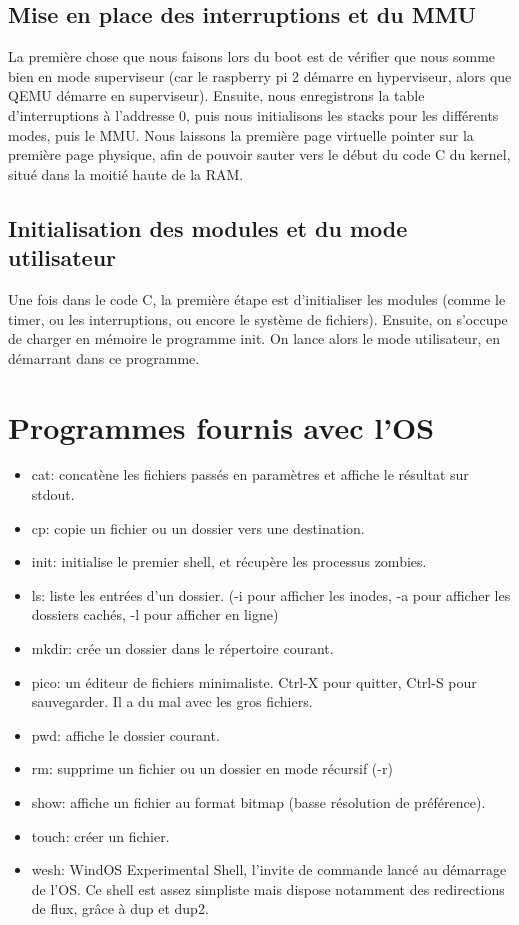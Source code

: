 \documentclass[a4paper]{article}
\begin{document}
\subsection{Mise en place des interruptions et du MMU}

La première chose que nous faisons lors du boot est de vérifier que nous somme
bien en mode superviseur (car le raspberry pi 2 démarre en hyperviseur, alors
que QEMU démarre en superviseur). Ensuite, nous enregistrons la table
d'interruptions à l'addresse 0, puis nous initialisons les stacks pour les
différents modes, puis le MMU. Nous laissons la première page virtuelle pointer
sur la première page physique, afin de pouvoir sauter vers le début du code C du
kernel, situé dans la moitié haute de la RAM.

\subsection{Initialisation des modules et du mode utilisateur}

Une fois dans le code C, la première étape est d'initialiser les modules (comme
le timer, ou les interruptions, ou encore le système de fichiers). Ensuite, on
s'occupe de charger en mémoire le programme init. On lance alors le mode
utilisateur, en démarrant dans ce programme.

\section{Programmes fournis avec l'OS}
\begin{itemize}
	\item cat: concatène les fichiers passés en paramètres et affiche le résultat sur stdout.
	\item cp: copie un fichier ou un dossier vers une destination.
	\item init: initialise le premier shell, et récupère les processus zombies.
	\item ls: liste les entrées d'un dossier. (-i pour afficher les inodes, -a pour afficher les dossiers cachés, -l pour afficher en ligne)
	\item mkdir: crée un dossier dans le répertoire courant.
	\item pico: un éditeur de fichiers minimaliste. Ctrl-X pour quitter, Ctrl-S pour sauvegarder. Il a du mal avec les gros fichiers.
	\item pwd: affiche le dossier courant.
	\item rm: supprime un fichier ou un dossier en mode récursif (-r)
	\item show: affiche un fichier au format bitmap (basse résolution de préférence).
	\item touch: créer un fichier.
	\item wesh: WindOS Experimental Shell, l'invite de commande lancé au démarrage de l'OS. Ce shell est assez simpliste mais dispose notamment des redirections de flux, grâce à dup et dup2.
\end{itemize}
\end{document}
